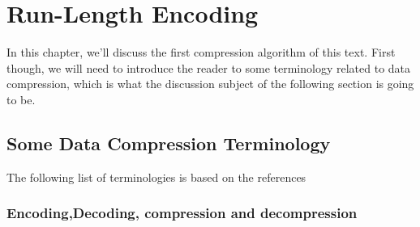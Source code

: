 \begin{comment}
  
\end{comment}








\chapter{Run-Length Encoding}
\label{cha:rle}

In this chapter, we'll discuss the first compression algorithm of this
text. First though, we will need to introduce the reader to some
terminology related to data compression, which is what the discussion
subject of the following section is going to be.

\section{Some Data Compression Terminology}

The following list of terminologies is based on the references
\cite{Salomon:2004:DCC,mark1996data_compression_book,Bell:1989:MTC:76894.76896}

\subsection{Encoding,Decoding, compression and decompression}

